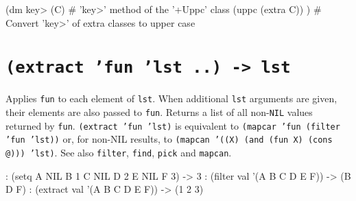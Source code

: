 \begin{wideverbatim}
(dm key> (C)            # 'key>' method of the '+Uppc' class
   (uppc (extra C)) )   # Convert 'key>' of extra classes to upper case
\end{wideverbatim}

 
\section*{\texttt{(extract 'fun 'lst ..) -> lst}}
\label{sec:func-ref-E-(extract 'fun 'lst ..) -> lst}

Applies \texttt{fun} to each element of \texttt{lst}. When additional \texttt{lst} arguments
are given, their elements are also passed to \texttt{fun}. Returns a list of
all non-\texttt{NIL} values returned by \texttt{fun}. \texttt{(extract 'fun 'lst)} is
equivalent to \texttt{(mapcar 'fun (filter 'fun 'lst))} or, for non-NIL
results, to \texttt{(mapcan '((X) (and (fun X) (cons @))) 'lst)}. See also
\texttt{filter}, \texttt{find}, \texttt{pick} and \texttt{mapcan}.


\begin{wideverbatim}
: (setq A NIL  B 1  C NIL  D 2  E NIL  F 3)
-> 3
: (filter val '(A B C D E F))
-> (B D F)
: (extract val '(A B C D E F))
-> (1 2 3)
\end{wideverbatim}




% 
